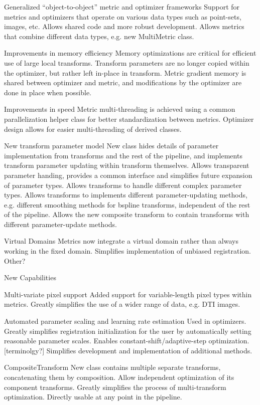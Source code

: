 \documentclass{frontiersSCNS}
\begin{document}
Generalized “object-to-object” metric and optimizer frameworks
Support for metrics and optimizers that operate on various data types such as point-sets, images, etc.
Allows shared code and more robust development.
Allows metrics that combine different data types, e.g. new MultiMetric class.

Improvements in memory efficiency
Memory optimizations are critical for efficient use of large local transforms.
Transform parameters are no longer copied within the optimizer, but rather left in-place in transform. 
Metric gradient memory is shared between optimizer and metric, and modifications by the optimizer  are done in place when possible.

Improvements in speed
Metric multi-threading is achieved using a common parallelization helper class for better standardization between metrics.
Optimizer design allows for easier multi-threading of derived classes.

New transform parameter model
New class hides details of parameter implementation from transforms and the rest of the pipeline, and implements transform parameter updating within transform themselves.
Allows transparent parameter handing, provides a common interface and simplifies future expansion of parameter types.
Allows transforms to handle different complex parameter types.
Allows transforms to implements different parameter-updating methods, e.g. different smoothing methods for bspline transforms, independent of the rest of the pipeline.
Allows the new composite transform to contain transforms with different parameter-update methods.

Virtual Domains
Metrics now integrate a virtual domain rather than always working in the fixed domain.
Simplifies implementation of unbiased registration.
Other?

New Capabilities

Multi-variate pixel support
Added support for variable-length pixel types within metrics.
Greatly simplifies the use of a wider range of data, e.g. DTI images.

Automated parameter scaling and learning rate estimation
Used in optimizers.
Greatly simplifies registration initialization for the user by automatically setting reasonable parameter scales.
Enables constant-shift/adaptive-step optimization. [terminolgy?]
Simplifies development and implementation of additional methods.

CompositeTransform
New class contains multiple separate transforms, concatenating them by composition.
Allow independent optimization of its component transforms.
Greatly simplifies the process of multi-transform optimization.
Directly usable at any point in the pipeline.
\end{document}
